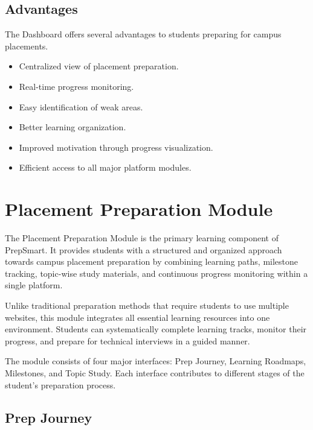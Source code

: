 \subsection{Advantages}

The Dashboard offers several advantages to students preparing for campus placements.

\begin{itemize}

\item Centralized view of placement preparation.

\item Real-time progress monitoring.

\item Easy identification of weak areas.

\item Better learning organization.

\item Improved motivation through progress visualization.

\item Efficient access to all major platform modules.

\end{itemize}

\section{Placement Preparation Module}

The Placement Preparation Module is the primary learning component of PrepSmart. It provides students with a structured and organized approach towards campus placement preparation by combining learning paths, milestone tracking, topic-wise study materials, and continuous progress monitoring within a single platform.

Unlike traditional preparation methods that require students to use multiple websites, this module integrates all essential learning resources into one environment. Students can systematically complete learning tracks, monitor their progress, and prepare for technical interviews in a guided manner.

The module consists of four major interfaces: Prep Journey, Learning Roadmaps, Milestones, and Topic Study. Each interface contributes to different stages of the student's preparation process.

\subsection{Prep Journey}

